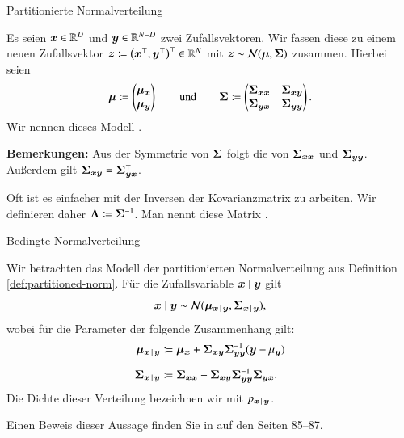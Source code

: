 \begin{frame}{Partitionierte Normalverteilung}{}
	\begin{mydef}
		Es seien $\bm{x} \in \mathbb{R}^D$ und $\bm{y} \in \mathbb{R}^{N - D}$ zwei Zufallsvektoren.
		Wir fassen diese zu einem neuen Zufallsvektor $\bm{z} \coloneqq \bigl( \bm{x}^\top, \bm{y}^\top \bigr)^\top \in \mathbb{R}^N$
		mit $\bm{z} \sim \mathcal{N}(\bm{\mu}, \bm{\Sigma})$ zusammen. Hierbei seien
		\begin{equation*}
			\bm{\mu}
				\coloneqq \begin{pmatrix} \bm{\mu}_{\bm{x}} \\ \bm{\mu}_{\bm{y}} \end{pmatrix}
		\qquad\text{und}\qquad
			\bm{\Sigma}
				\coloneqq \begin{pmatrix}
					\bm{\Sigma}_{\bm{x}\bm{x}} & \bm{\Sigma}_{\bm{x}\bm{y}} \\
					\bm{\Sigma}_{\bm{y}\bm{x}} & \bm{\Sigma}_{\bm{y}\bm{y}}
				\end{pmatrix}.
		\end{equation*}
		Wir nennen dieses Modell .
	\end{mydef}
	
	\begin{boxGray}
		\textbf{Bemerkungen:} Aus der Symmetrie von $\bm{\Sigma}$ folgt die von $\bm{\Sigma}_{\bm{x}\bm{x}}$ und $\bm{\Sigma}_{\bm{y}\bm{y}}$.
		Außerdem gilt $\bm{\Sigma}_{\bm{x}\bm{y}} = \bm{\Sigma}_{\bm{y}\bm{x}}^\top$.
		
		Oft ist es einfacher mit der Inversen der Kovarianzmatrix zu arbeiten. Wir definieren daher
		$\bm{\Lambda} \coloneqq \bm{\Sigma}^{-1}$. Man nennt diese Matrix .
	\end{boxGray}
\end{frame}


\begin{frame}{Bedingte Normalverteilung}{}
	\begin{mytheo}
		Wir betrachten das Modell der partitionierten Normalverteilung aus Definition \ref{def:partitioned-norm}.
		Für die Zufallsvariable $\bm{x} \mid \bm{y}$ gilt
		\begin{equation*}
			\bm{x} \mid \bm{y} \sim \mathcal{N}(\bm{\mu}_{\bm{x}\,\mid\,\bm{y}}, \bm{\Sigma}_{\bm{x}\,\mid\,\bm{y}}),
		\end{equation*}
		wobei für die Parameter der folgende Zusammenhang gilt:
		\begin{align*}
			\bm{\mu}_{\bm{x}\,\mid\,\bm{y}}
				&\coloneqq \bm{\mu}_{\bm{x}} + \bm{\Sigma}_{\bm{x}\bm{y}} \bm{\Sigma}_{\bm{y}\bm{y}}^{-1}(\bm{y} - \mu_{\bm{y}})
		\\[2mm]
			\bm{\Sigma}_{\bm{x}\,\mid\,\bm{y}}
				&\coloneqq \bm{\Sigma}_{\bm{x}\bm{x}} - \bm{\Sigma}_{\bm{x}\bm{y}} \bm{\Sigma}_{\bm{y}\bm{y}}^{-1} \bm{\Sigma}_{\bm{y}\bm{x}}.
		\end{align*}
		Die Dichte dieser Verteilung bezeichnen wir mit $p_{\bm{x}\,\mid\,\bm{y}}$.
	\end{mytheo}

	\begin{myproof}
		Einen Beweis dieser Aussage finden Sie in \cite{Bishop2006} auf den Seiten 85--87.
	\end{myproof}
\end{frame}


